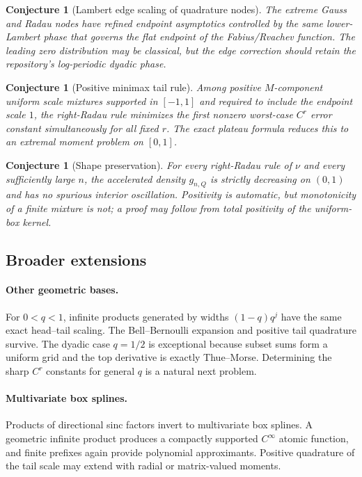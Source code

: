 \documentclass[11pt]{article}
\newtheorem{conjecture}[theorem]{Conjecture}
\theoremstyle{definition}
\theoremstyle{remark}
\begin{document}
\begin{conjecture}[Lambert edge scaling of quadrature nodes]
\label{conj:lambert-edge}
The extreme Gauss and Radau nodes have refined endpoint asymptotics controlled by the
same lower-Lambert phase that governs the flat endpoint of the Fabius/Rvachev function.
The leading zero distribution may be classical, but the edge correction should retain
the repository's log-periodic dyadic phase.
\end{conjecture}

\begin{conjecture}[Positive minimax tail rule]
\label{conj:minimax}
Among positive $M$-component uniform scale mixtures supported in $[-1,1]$ and required
to include the endpoint scale $1$, the right-Radau rule minimizes the first nonzero
worst-case $C^r$ error constant simultaneously for all fixed $r$.  The exact plateau
formula reduces this to an extremal moment problem on $[0,1]$.
\end{conjecture}

\begin{conjecture}[Shape preservation]
For every right-Radau rule of $\nu$ and every sufficiently large $n$, the accelerated
density $g_{n,Q}$ is strictly decreasing on $(0,1)$ and has no spurious interior
oscillation.  Positivity is automatic, but monotonicity of a finite mixture is not; a
proof may follow from total positivity of the uniform-box kernel.
\end{conjecture}

\subsection{Broader extensions}

\paragraph{Other geometric bases.}
For $0<q<1$, infinite products generated by widths $(1-q)q^j$ have the same exact
head--tail scaling.  The Bell--Bernoulli expansion and positive tail quadrature survive.
The dyadic case $q=1/2$ is exceptional because subset sums form a uniform grid and the
top derivative is exactly Thue--Morse.  Determining the sharp $C^r$ constants for
general $q$ is a natural next problem.

\paragraph{Multivariate box splines.}
Products of directional sinc factors invert to multivariate box splines.  A geometric
infinite product produces a compactly supported $C^\infty$ atomic function, and finite
prefixes again provide polynomial approximants.  Positive quadrature of the tail scale
may extend with radial or matrix-valued moments.
\end{document}
